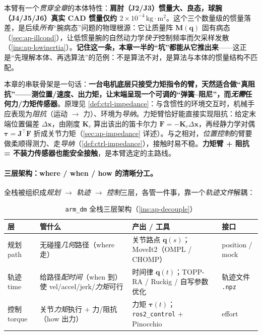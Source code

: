 \begin{insight}\label{ins:ap-heterogeneous}
本臂有一个\emph{贯穿全章}的本体特性：\textbf{肩肘（J2/J3）惯量大、良态，球腕（J4/J5/J6）真实 CAD 惯量仅约 $2\times10^{-4}\,\mathrm{kg\!\cdot\! m^2}$}。这个三个数量级的惯量落差，是后续\emph{所有}“腕病态”问题的物理根源：它让质量阵 $\mathbf{M}(\mathbf{q})$ 固有病态（\cref{sec:ap-illcond}），让低惯量腕的自然动力学\emph{快于}控制频率而欠采样发散（\cref{ins:ap-lowinertia}）。\textbf{记住这一条，本章一半的“坑”都能从它推出来}——这正是“先理解本体、再选算法”的范例：不是算法不对，是算法与本体的惯量结构不匹配。
\end{insight}

\begin{insight}\label{ins:ap-torque-impedance}
本章的串联骨架是一句话：\textbf{一台电机底层只接受力矩指令的臂，天然适合做“真阻抗”——测位置/速度、出力矩，让末端呈现一个可调的“弹簧--阻尼”，而\emph{无需}任何力/力矩传感器}。原理见 \cref{def:ctrl-impedance}：与含惯性的环境交互时，机械手应表现为\emph{阻抗}（运动 $\to$ 力）、环境为\emph{导纳}。力矩臂恰好能直接实现阻抗：给定末端位置偏差 $\Delta\mathbf{x}$，由刚度 $\mathbf{K}_c$ 算出该出的笛卡尔力 $\mathbf{F}=-\mathbf{K}_c\Delta\mathbf{x}$，再经静力学对偶 $\boldsymbol{\tau}=\mathbf{J}^\top\mathbf{F}$ 折成关节力矩（\cref{sec:ap-impedance} 详述）。与之相对，\emph{位置控制}的臂要做柔顺得测力、走\emph{导纳}（\cref{def:ctrl-impedance}），接触时易不稳。\textbf{力矩臂 + 阻抗 = 不装力传感器也能安全接触}，是本臂选定的主路线。
\end{insight}

\paragraph{三层架构：where / when / how 的清晰分工。}
全栈被组织成\emph{规划 $\to$ 轨迹 $\to$ 控制}三层，各管一件事，靠一个\emph{轨迹文件}解耦：

\begin{table}[H]\centering\small
\caption{\texttt{arm\_dm} 全栈三层架构（\cref{ins:ap-decouple}）}
\begin{tabular}{p{} p{} p{} p{}}
\toprule
层 & 管什么 & 产出 / 工具 & 接口 \\
\midrule
规划 path & 无碰撞\emph{几何}路径（where 走）& 关节路点 $\mathbf{q}(s)$；MoveIt2（OMPL / CHOMP）& position / mock \\
轨迹 time & 给路径\emph{配时间}（when 到）使 vel/accel/jerk/\emph{力矩}可行 & 时间律 $\mathbf{q}(t)$；TOPP-RA / Ruckig / 自写参数优化 & 轨迹文件 \texttt{.npz} \\
控制 torque & 关节\emph{力矩}执行 + 力/阻抗（how 出力）& 力矩 $\boldsymbol{\tau}(t)$；\texttt{ros2\_control} + Pinocchio & effort \\
\bottomrule
\end{tabular}
\label{tab:ap-arch}
\end{table}

